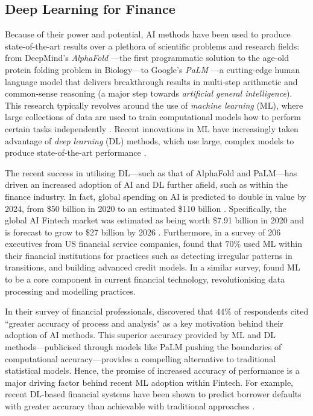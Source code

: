 \documentclass[a4paper, 11pt]{report}
\begin{document}
    \subsection{Deep Learning for Finance}

    Because of their power and potential, AI methods have been used to produce state-of-the-art results over a plethora of scientific problems and research fields: from DeepMind's \emph{AlphaFold} \citep{jumper-2021}---the first programmatic solution to the age-old protein folding problem in Biology---to Google's \emph{PaLM} \citep{chowdhery-2022}---a cutting-edge human language model that delivers breakthrough results in multi-step arithmetic and common-sense reasoning (a major step towards \emph{artificial general intelligence}). This research typically revolves around the use of \emph{machine learning} (ML), where large collections of data are used to train computational models how to perform certain tasks independently \citep{samuel-1959}. Recent innovations in ML have increasingly taken advantage of \emph{deep learning} (DL) methods, which use large, complex models to produce state-of-the-art performance \citep{witten-2017}.

    The recent success in utilising DL---such as that of AlphaFold and PaLM---has driven an increased adoption of AI and DL further afield, such as within the finance industry. In fact, global spending on AI is predicted to double in value by 2024, from \$50 billion in 2020 to an estimated \$110 billion \citep{oecd-2021}. Specifically, the global AI Fintech market was estimated as being worth \$7.91 billion in 2020 and is forecast to grow to \$27 billion by 2026 \citep{mordor-2021}. Furthermore, in a survey of 206 executives from US financial service companies, \citet{gokhale-2019} found that $70\%$ used ML within their financial institutions for practices such as detecting irregular patterns in transitions, and building advanced credit models. In a similar survey, \citet{chartis-2019} found ML to be a core component in current financial technology, revolutionising data processing and modelling practices.

    In their survey of financial professionals, \citet{chartis-2019} discovered that $44\%$ of respondents cited ``greater accuracy of process and analysis" as a key motivation behind their adoption of AI methods. This superior accuracy provided by ML and DL methods---publicised through models like PaLM pushing the boundaries of computational accuracy---provides a compelling alternative to traditional statistical models. Hence, the promise of increased accuracy of performance is a major driving factor behind recent ML adoption within Fintech. For example, recent DL-based financial systems have been shown to predict borrower defaults with greater accuracy than achievable with traditional approaches \citep{albanesi-2019}.
\end{document}
